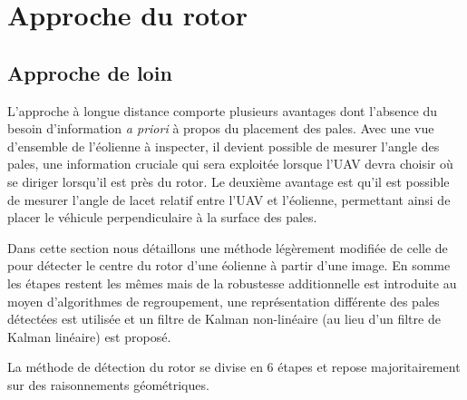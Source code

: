 \section{Approche du rotor}

\subsection{Approche de loin}

L'approche à longue distance comporte plusieurs avantages dont l'absence du besoin d'information \textit{a priori} à propos du placement des pales. Avec une vue d'ensemble de l'éolienne à inspecter, il devient possible de mesurer l'angle des pales, une information cruciale qui sera exploitée lorsque l'UAV devra choisir où se diriger lorsqu'il est près du rotor. Le deuxième avantage est qu'il est possible de mesurer l'angle de lacet relatif entre l'UAV et l'éolienne, permettant ainsi de placer le véhicule perpendiculaire à la surface des pales.

Dans cette section nous détaillons une méthode légèrement modifiée de celle de \citep{Stokkeland2015} pour détecter le centre du rotor d'une éolienne à partir d'une image. En somme les étapes restent les mêmes mais de la robustesse additionnelle est introduite au moyen d'algorithmes de regroupement, une représentation différente des pales détectées est utilisée et un filtre de Kalman non-linéaire (au lieu d'un filtre de Kalman linéaire) est proposé.

La méthode de détection du rotor se divise en 6 étapes et repose majoritairement sur des raisonnements géométriques.


